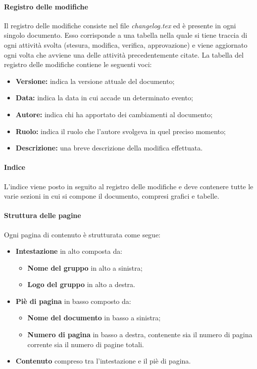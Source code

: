 \paragraph{Registro delle modifiche}
Il registro delle modifiche consiste nel file \textit{changelog.tex} ed è presente in ogni singolo documento.
Esso corrisponde a una tabella nella quale si tiene traccia di ogni attività svolta (stesura, modifica, verifica, approvazione) e viene aggiornato ogni volta che avviene una delle attività precedentemente citate.
La tabella del registro delle modifiche contiene le seguenti voci:
\begin{itemize}
    \item \textbf{Versione:} indica la versione attuale del documento;
    \item \textbf{Data:} indica la data in cui accade un determinato evento;
    \item \textbf{Autore:} indica chi ha apportato dei cambiamenti al documento;
    \item \textbf{Ruolo:} indica il ruolo che l'autore svolgeva in quel preciso momento;
    \item \textbf{Descrizione:} una breve descrizione della modifica effettuata.
\end {itemize}
\paragraph{Indice}
L'indice viene posto in seguito al registro delle modifiche e deve contenere tutte le varie sezioni in cui si compone il documento, compresi grafici e tabelle.
\paragraph{Struttura delle pagine}
Ogni pagina di contenuto è strutturata come segue:
\begin {itemize}
    \item \textbf{Intestazione} in alto composta da:
    \begin {itemize}
        \item \textbf{Nome del gruppo} in alto a sinistra;
        \item \textbf{Logo del gruppo} in alto a destra.
    \end{itemize}
    \item \textbf{Piè di pagina} in basso composto da:
    \begin{itemize}
        \item \textbf{Nome del documento} in basso a sinistra;
        \item \textbf{Numero di pagina} in basso a destra, contenente sia il numero di pagina corrente sia il numero di pagine totali.
    \end {itemize}
    \item \textbf{Contenuto} compreso tra l'intestazione e il piè di pagina.
\end {itemize}
